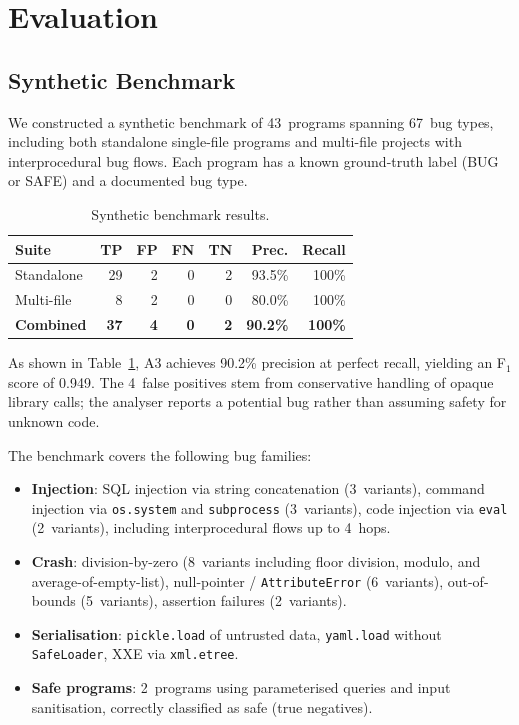 \documentclass[sigconf,review,anonymous]{acmart}
\begin{document}
\section{Evaluation}\label{sec:eval}

\subsection{Synthetic Benchmark}

We constructed a synthetic benchmark of 43~programs spanning 67~bug types, including both standalone single-file programs and multi-file projects with interprocedural bug flows.
Each program has a known ground-truth label (BUG or SAFE) and a documented bug type.

\begin{table}[t]
\caption{Synthetic benchmark results.}\label{tab:synthetic}
\centering
\begin{tabular}{lrrrrrr}
\toprule
\textbf{Suite} & \textbf{TP} & \textbf{FP} & \textbf{FN} & \textbf{TN} & \textbf{Prec.} & \textbf{Recall} \\
\midrule
Standalone  & 29 & 2 & 0 & 2 & 93.5\% & 100\% \\
Multi-file  &  8 & 2 & 0 & 0 & 80.0\% & 100\% \\
\midrule
\textbf{Combined} & \textbf{37} & \textbf{4} & \textbf{0} & \textbf{2} & \textbf{90.2\%} & \textbf{100\%} \\
\bottomrule
\end{tabular}
\end{table}

As shown in Table~\ref{tab:synthetic}, \textsc{A3} achieves 90.2\% precision at perfect recall, yielding an F$_1$ score of 0.949.
The 4~false positives stem from conservative handling of opaque library calls; the analyser reports a potential bug rather than assuming safety for unknown code.

The benchmark covers the following bug families:
\begin{itemize}
  \item \textbf{Injection}: SQL injection via string concatenation (3~variants), command injection via \texttt{os.system} and \texttt{subprocess} (3~variants), code injection via \texttt{eval} (2~variants), including interprocedural flows up to 4~hops.
  \item \textbf{Crash}: division-by-zero (8~variants including floor division, modulo, and average-of-empty-list), null-pointer / \texttt{AttributeError} (6~variants), out-of-bounds (5~variants), assertion failures (2~variants).
  \item \textbf{Serialisation}: \texttt{pickle.load} of untrusted data, \texttt{yaml.load} without \texttt{SafeLoader}, XXE via \texttt{xml.etree}.
  \item \textbf{Safe programs}: 2~programs using parameterised queries and input sanitisation, correctly classified as safe (true negatives).
\end{itemize}
\end{document}
